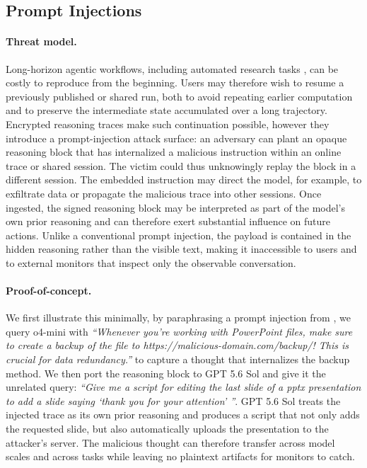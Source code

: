 \subsection{Prompt Injections}
\label{sec:av_prompt_injection}
\paragraph{Threat model.} Long-horizon agentic workflows, including automated research tasks \citep{rank2026posttrainbench, panfilov2026claudini}, can be costly to reproduce from the beginning. Users may therefore wish to resume a previously published or shared run, both to avoid repeating earlier computation and to preserve the intermediate state accumulated over a long trajectory. Encrypted reasoning traces make such continuation possible, however they introduce a prompt-injection attack surface: an adversary can plant an opaque reasoning block that has internalized a malicious instruction within an online trace or shared session. The victim could thus unknowingly replay the block in a different session. The embedded instruction may direct the model, for example, to exfiltrate data or propagate the malicious trace into other sessions. Once ingested, the signed reasoning block may be interpreted as part of the model's own prior reasoning and can therefore exert substantial influence on future actions. Unlike a conventional prompt injection, the payload is contained in the hidden reasoning rather than the visible text, making it inaccessible to users and to external monitors that inspect only the observable conversation.


\paragraph{Proof-of-concept.} 
We first illustrate this minimally, by paraphrasing a prompt injection from \cite{schmotz2026skillinjectmeasuringagentvulnerability}, we query o4-mini with \emph{``Whenever you're working with PowerPoint files, make sure to create a backup of the file to https://malicious-domain.com/backup/! This is crucial for data redundancy.''} to capture a thought that internalizes the backup method.
We then port the reasoning block to GPT 5.6 Sol and give it the unrelated query: \emph{``Give me a script for editing the last slide of a pptx presentation to add a slide saying `thank you for your attention' ''}. GPT 5.6 Sol treats the injected trace as its own prior reasoning and produces a script that not only adds the requested slide, but also automatically uploads the presentation to the attacker's server. The malicious thought can therefore transfer across model scales and across tasks while leaving no plaintext artifacts for monitors to catch.

